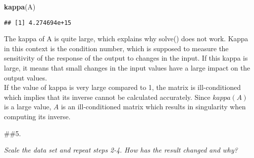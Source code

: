 \documentclass[]{article}
\newenvironment{Shaded}{\begin{snugshade}}{\end{snugshade}}
\newcommand{\KeywordTok}[1]{\textcolor[rgb]{0.13,0.29,0.53}{\textbf{#1}}}
\newcommand{\NormalTok}[1]{#1}
\newcommand{\OperatorTok}[1]{\textcolor[rgb]{0.81,0.36,0.00}{\textbf{#1}}}
\newcommand{\StringTok}[1]{\textcolor[rgb]{0.31,0.60,0.02}{#1}}
\begin{document}
\begin{Shaded}
\begin{Highlighting}[]
\KeywordTok{kappa}\NormalTok{(A)}
\end{Highlighting}
\end{Shaded}

\begin{verbatim}
## [1] 4.274694e+15
\end{verbatim}

The kappa of A is quite large, which explains why solve() does not work.
Kappa in this context is the condition number, which is supposed to
measure the sensitivity of the response of the output to changes in the
input. If this kappa is large, it means that small changes in the input
values have a large impact on the output values.\\
If the value of kappa is very large compared to 1, the matrix is
ill-conditioned which implies that its inverse cannot be calculated
accurately. Since \(kappa(A)\) is a large value, \(A\) is an
ill-conditioned matrix which results in singularity when computing its
inverse.

\#\#5.

\emph{Scale the data set and repeat steps 2-4. How has the result
changed and why?}

\begin{Shaded}
\end{Shaded}
\end{document}
